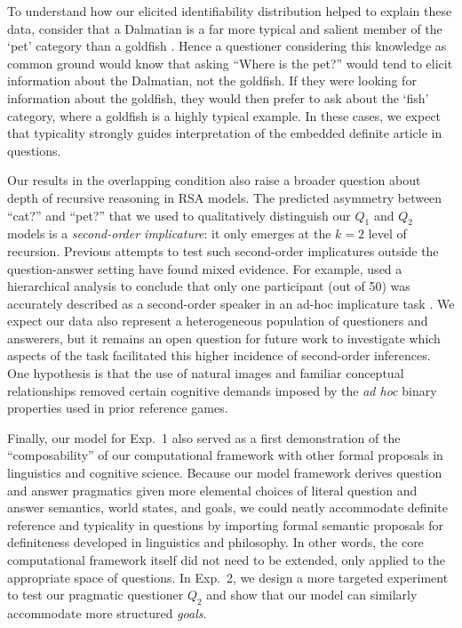 \documentclass[11pt, floatsintext]{apa6}
\begin{document}
To understand how our elicited identifiability distribution helped to explain these data, consider that a Dalmatian is a far more typical and salient member of the `pet' category than a goldfish \cite{Rosch75}. 
Hence a questioner considering this knowledge as common ground would know that asking ``Where is the pet?'' would tend to elicit information about the Dalmatian, not the goldfish. 
If they were looking for information about the goldfish, they would then prefer to ask about the `fish' category, where a goldfish is a highly typical example. 
In these cases, we expect that typicality strongly guides interpretation of the embedded definite article in questions.

Our results in the overlapping condition also raise a broader question about depth of recursive reasoning in RSA models.
The predicted asymmetry between ``cat?'' and ``pet?'' that we used to qualitatively distinguish our $Q_1$ and $Q_2$ models is a \emph{second-order implicature}: it only emerges at the $k =2$ level of recursion.
Previous attempts to test such second-order implicatures outside the question-answer setting have found mixed evidence. 
For example,  used a hierarchical analysis to conclude that only one participant (out of 50) was accurately described as a second-order speaker in an ad-hoc implicature task \cite<see also>{frank2017rational}.
We expect our data also represent a heterogeneous population of questioners and answerers, but it remains an open question for future work to investigate which aspects of the task facilitated this higher incidence of second-order inferences.
One hypothesis is that the use of natural images and familiar conceptual relationships removed certain cognitive demands imposed by the \emph{ad hoc} binary properties used in prior reference games.

Finally, our model for Exp.~1 also served as a first demonstration of the ``composability'' of our computational framework with other formal proposals in linguistics and cognitive science.
Because our model framework derives question and answer pragmatics given more elemental choices of literal question and answer semantics, world states, and goals, we could neatly accommodate definite reference and typicality in questions by importing formal semantic proposals for definiteness developed in linguistics and philosophy.
In other words, the core computational framework itself did not need to be extended, only applied to the appropriate space of questions. 
In Exp.~2, we design a more targeted experiment to test our pragmatic questioner $Q_2$ and show that our model can similarly accommodate more structured \emph{goals}.
\end{document}

